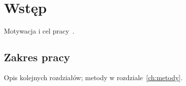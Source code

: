 \chapter{Wstęp}
\label{ch:wstep}

Motywacja i cel pracy~\cite{knuth1984}.

\section{Zakres pracy}
Opis kolejnych rozdziałów; metody w rozdziale~\ref{ch:metody}.

